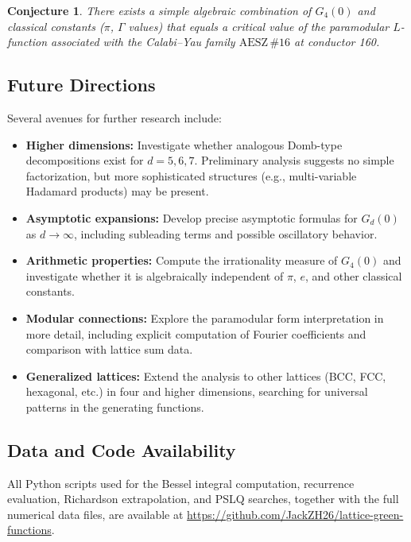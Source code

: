 \documentclass[12pt,a4paper]{article}
\numberwithin{equation}{section}
\theoremstyle{plain}
\newtheorem{conjecture}[theorem]{Conjecture}
\theoremstyle{definition}
\theoremstyle{remark}
\newcommand{\aesz}[1]{\mathrm{AESZ}\,\#\!{#1}}
\begin{document}
\begin{conjecture}\label{conj:lfunction}
  There exists a simple algebraic combination of $G_4(0)$ and classical constants ($\pi$, $\Gamma$ values)
  that equals a critical value of the paramodular $L$-function associated with the Calabi--Yau family
  $\aesz{16}$ at conductor 160.
\end{conjecture}

\subsection{Future Directions}

Several avenues for further research include:
\begin{itemize}[leftmargin=*,itemsep=2pt]
  \item \textbf{Higher dimensions:} Investigate whether analogous Domb-type decompositions exist
    for $d = 5, 6, 7$. Preliminary analysis suggests no simple factorization, but more sophisticated
    structures (e.g., multi-variable Hadamard products) may be present.

  \item \textbf{Asymptotic expansions:} Develop precise asymptotic formulas for $G_d(0)$ as $d \to \infty$,
    including subleading terms and possible oscillatory behavior.

  \item \textbf{Arithmetic properties:} Compute the irrationality measure of $G_4(0)$ and investigate
    whether it is algebraically independent of $\pi$, $e$, and other classical constants.

  \item \textbf{Modular connections:} Explore the paramodular form interpretation in more detail,
    including explicit computation of Fourier coefficients and comparison with lattice sum data.

  \item \textbf{Generalized lattices:} Extend the analysis to other lattices (BCC, FCC, hexagonal, etc.)
    in four and higher dimensions, searching for universal patterns in the generating functions.
\end{itemize}

\subsection{Data and Code Availability}

All Python scripts used for the Bessel integral computation, recurrence evaluation, Richardson
extrapolation, and PSLQ searches, together with the full numerical data files,
are available at \url{https://github.com/JackZH26/lattice-green-functions}.
\end{document}
